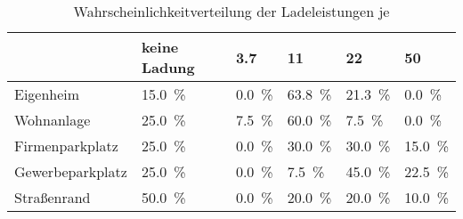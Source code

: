 {
\renewcommand{\arraystretch}{1.2}%
\begin{table}[H]
	\begin{center}
		\caption{Wahrscheinlichkeitverteilung der Ladeleistungen je \UC}
		\begin{tabu} to \textwidth {X[1.7] X[1.3, r] X[1, r] X[1, r] X[1, r] X[1, r]}
			\hline
			\UC			  	 & keine Ladung        & \SI{3.7}{\kw}      & \SI{11}{\kw}        & \SI{22}{\kw}        & \SI{50}{\kw}        \\ \hline
			Eigenheim        & \SI{15.0}{\percent} & \SI{0.0}{\percent} & \SI{63.8}{\percent} & \SI{21.3}{\percent} & \SI{0.0}{\percent}  \\
			Wohnanlage       & \SI{25.0}{\percent} & \SI{7.5}{\percent} & \SI{60.0}{\percent} & \SI{7.5}{\percent}  & \SI{0.0}{\percent}  \\
			Firmenparkplatz  & \SI{25.0}{\percent} & \SI{0.0}{\percent} & \SI{30.0}{\percent} & \SI{30.0}{\percent} & \SI{15.0}{\percent} \\
			Gewerbeparkplatz & \SI{25.0}{\percent} & \SI{0.0}{\percent} & \SI{7.5}{\percent}  & \SI{45.0}{\percent} & \SI{22.5}{\percent} \\
			Straßenrand      & \SI{50.0}{\percent} & \SI{0.0}{\percent} & \SI{20.0}{\percent} & \SI{20.0}{\percent} & \SI{10.0}{\percent} \\ \hline
		\end{tabu}
		\label{tab:UCProbability2050}
	\end{center}
	\vspace{-3mm}%
\end{table}
}